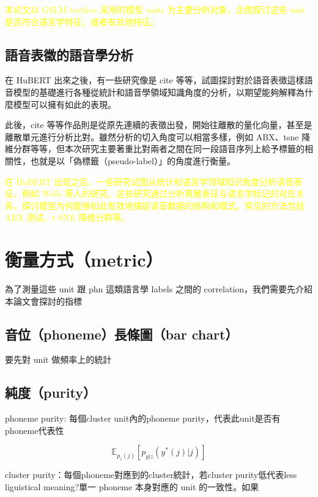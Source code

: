 \textcolor{yellow}{
本论文以 GSLM textless 采用的模型 units 为主要分析对象，企图探讨这些 unit 是否符合语言学特征，或者有其他特征。
}


\subsection{語音表徵的語音學分析}
在 HuBERT 出來之後，有一些研究像是 cite 等等，試圖探討對於語音表徵這樣語音模型的基礎進行各種從統計和語音學領域知識角度的分析，以期望能夠解釋為什麼模型可以擁有如此的表現。

此後，cite 等等作品則是從原先連續的表徵出發，開始往離散的量化向量，甚至是離散單元進行分析比對。雖然分析的切入角度可以相當多樣，例如 ABX、tsne 降維分群等等，但本次研究主要著重比對兩者之間在同一段語音序列上給予標籤的相關性，也就是以「偽標籤（pseudo-label）」的角度進行衡量。


\textcolor{yellow}{
    在 HuBERT 出现之后，一些研究试图从统计和语言学领域知识角度分析语音表征，例如 Wells 等人的研究。这些研究通过分析离散表征与语言学标记的对应关系，探讨模型为何能够如此有效地捕捉语音数据的结构和模式。常见的方法包括 ABX 测试、t-SNE 降维分群等。
    }


 
\section{衡量方式（metric）}

為了測量這些 unit 跟 phn 這類語言學 labels 之間的 correlation，我們需要先介紹本論文會探討的指標

\subsection{音位（phoneme）長條圖（bar chart）}

要先對 unit 做頻率上的統計

\subsection{純度（purity）}


phoneme purity: 每個cluster unit內的phoneme purity，代表此unit是否有phoneme代表性

\newcommand{\E}{\mathbb{E}}

$$\E_{p_z(j)}\left[p_{y|z}(y^*(j)|j) \right]$$

cluster purity：每個phoneme對應到的cluster統計，若cluster purity低代表less liguistical meaning?單一 phoneme 本身對應的 unit 的一致性。如果

